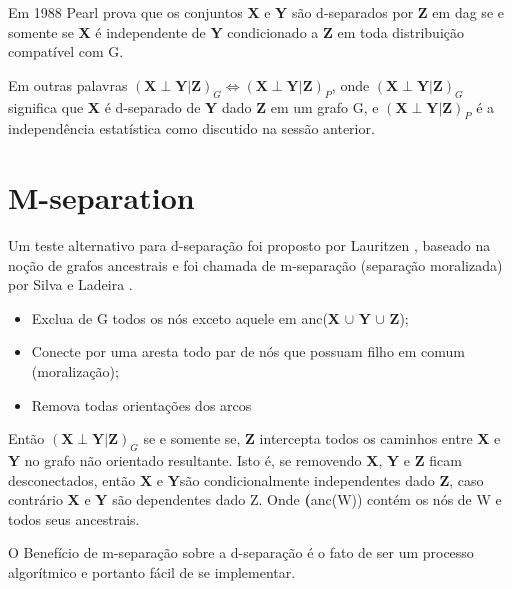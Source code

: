 Em 1988 Pearl prova que os conjuntos \textbf{X} e \textbf{Y} são d-separados por \textbf{Z} em \gls{dag} se e somente se \textbf{X} é independente de \textbf{Y} condicionado a \textbf{Z} em toda distribuição compatível com G.

Em outras palavras $(\textbf{X} \perp \textbf{Y}|\textbf{Z})_G \Leftrightarrow (\textbf{X}\perp\textbf{Y}|\textbf{Z})_P$, onde $(\textbf{X}\perp\textbf{Y}|\textbf{Z})_G$ significa que \textbf{X} é d-separado de \textbf{Y} dado \textbf{Z} em um grafo G, e $(\textbf{X}\perp \textbf{Y}|\textbf{Z})_P$ é a independência estatística como discutido na sessão anterior.

\section{M-separation}
Um teste alternativo para d-separação foi proposto por Lauritzen \cite{lauritzen90}, baseado na noção de grafos ancestrais e foi chamada de m-separação (separação moralizada) por Silva e Ladeira \cite{daSL02}.
\begin{itemize}
	\item Exclua de G todos os nós exceto aquele em anc(\textbf{X} $\cup$ \textbf{Y} $\cup$ \textbf{Z});
	\item Conecte por uma aresta todo par de nós que possuam filho em comum (moralização);
	\item Remova todas orientações dos arcos
\end{itemize}
Então $(\textbf{X} \perp \textbf{Y}|\textbf{Z})_G$ se e somente se, \textbf{Z} intercepta todos os caminhos entre \textbf{X} e \textbf{Y} no grafo não orientado resultante. Isto é, se removendo \textbf{X}, \textbf{Y} e \textbf{Z} ficam desconectados, então \textbf{X} e \textbf{Y}são condicionalmente independentes dado \textbf{Z}, caso contrário \textbf{X} e \textbf{Y} são dependentes dado Z. Onde \textbf(anc(W)) contém os nós de W e todos seus ancestrais.

O Benefício de m-separação sobre a d-separação é o fato de ser um processo algorítmico e portanto fácil de se implementar.
